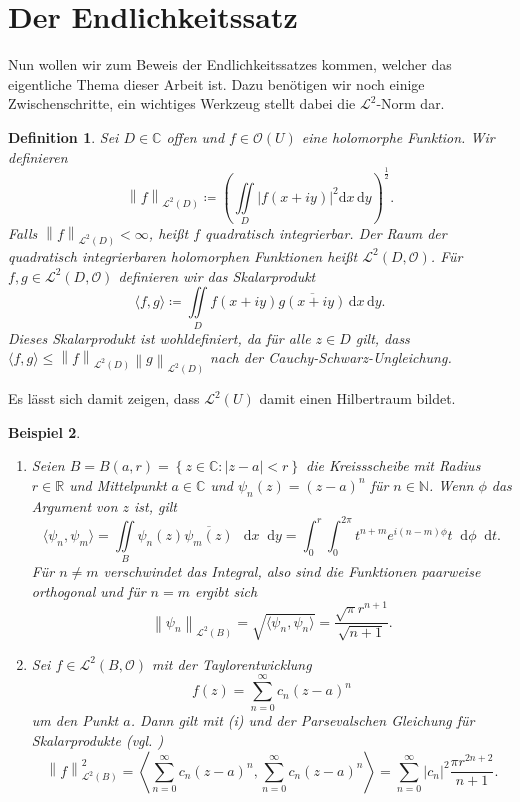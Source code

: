 \documentclass[11pt,a4paper,toc=bibliography]{scrartcl}
\theoremstyle{def}
\newtheorem{defi}{Definition}[section]
\theoremstyle{thm}
\newtheorem{bsp}[defi]{Beispiel}
\theoremstyle{remark}
\newcommand*{\norm}[1]{\left\lVert#1\right\rVert} %
\newcommand*\dif{\mathop{}\!\mathrm{d}}\newcommand{\einschraenkung}{\,\rule[-5pt]{0.4pt}{12pt}\,{}} %
\begin{document}

\nomenclature[Od]{$\norm{\cdot}_{\mathcal{L}^2(D)}$}{$\mathcal{L}^2$-Norm, \nomrefpage}
\section{Der Endlichkeitssatz}
Nun wollen wir zum Beweis der Endlichkeitssatzes kommen, welcher das eigentliche Thema dieser Arbeit ist. Dazu benötigen wir noch einige Zwischenschritte, ein wichtiges Werkzeug stellt dabei die $\mathcal{L}^2$-Norm dar. 

\begin{defi}
Sei $D\in \mathbb{C}$ offen und $f\in \mathcal{O}(U)$ eine holomorphe Funktion. Wir definieren 
$$
\norm{f}_{\mathcal{L}^2(D)}\coloneqq \left( \iint \limits_D |f(x+iy)|^2 \mathrm{d}x\,\mathrm{d}y \right)^{\frac{1}{2}}.
$$
Falls $\norm{f}_{\mathcal{L}^2(D)} < \infty$, heißt $f$ \emph{quadratisch integrierbar}. Der Raum der quadratisch integrierbaren holomorphen Funktionen heißt $\mathcal{L}^2(D,\mathcal{O})$.
Für $f,g \in \mathcal{L}^2(D,\mathcal{O})$ definieren wir das Skalarprodukt 
$$
\langle f,g\rangle \coloneqq \iint\limits_D f(x+iy)\overline{g(x+iy)} \,\mathrm{d}x\,\mathrm{d}y.
$$
Dieses Skalarprodukt ist wohldefiniert, da für alle $z\in D$ gilt, dass $\langle f,g\rangle \leq \norm{f}_{\mathcal{L}^2(D)}\norm{g}_{\mathcal{L}^2(D)}$ nach der Cauchy-Schwarz-Ungleichung.
\end{defi}
Es lässt sich damit zeigen, dass $\mathcal{L}^2(U)$ damit einen Hilbertraum bildet. 
\begin{bsp}
\begin{enumerate}
\item
Seien $B=B(a,r)=\left\{ z\in\mathbb{C}: |z-a|<r\right\}$ die Kreissscheibe mit Radius $r\in\mathbb{R}$ und Mittelpunkt $a\in\mathbb{C}$ und $\psi_n(z) = (z-a)^n$ für $n\in \mathbb{N}$. Wenn $\phi$ das Argument von $z$ ist, gilt 
$$
\langle\psi_n,\psi_m \rangle = \iint\limits_B \psi_n(z)\overline{\psi_m(z)}\,\dif x\dif y = \int_0^{r}\int_0^{2\pi} t^{n+m}e^{i(n-m)\phi}t\dif \phi\dif t.
$$
Für $n\neq m$ verschwindet das Integral, also sind die Funktionen paarweise orthogonal und für $n=m$ ergibt sich $$
\norm{\psi_n}_{\mathcal{L}^2(B)}= \sqrt{\langle \psi_n,\psi_n \rangle} = \dfrac{\sqrt{\pi} r^{n+1}}{\sqrt{n+1}}.$$
\item
Sei $f\in \mathcal{L}^2(B,\mathcal{O})$ mit der Taylorentwicklung 
$$
f(z) = \sum_{n=0}^{\infty} c_n(z-a)^n
$$
um den Punkt $a$. Dann gilt mit (i) und der Parsevalschen Gleichung für Skalarprodukte (vgl. \cite[~S.255]{funkana})
$$
\norm{f}_{\mathcal{L}^2(B)}^2 =\left\langle \sum_{n=0}^{\infty} c_n(z-a)^n,\sum_{n=0}^{\infty} c_n(z-a)^n\right\rangle = \sum_{n=0}^{\infty} |c_n|^2 \frac{\pi r^{2n+2}}{n+1}.
$$
\end{enumerate}
\end{bsp}
\end{document}
